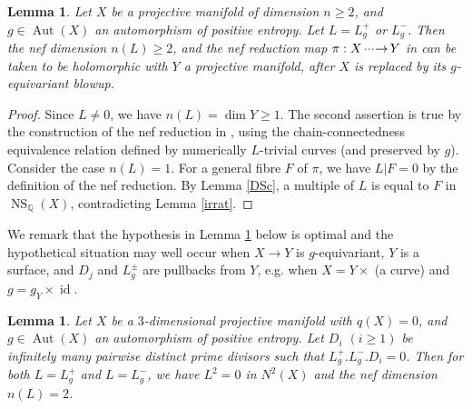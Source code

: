 \documentclass[11pt,a4paper,psamsfonts]{amsart}
\theoremstyle{plain}
\newtheorem{lemma}[thm]{Lemma}
\theoremstyle{definition}
\theoremstyle{remark}
\begin{document}
\begin{lemma}\label{nefR}
Let $X$ be a projective manifold of dimension $n \ge 2$, and $g \in {\operatorname{Aut}}(X)$
an automorphism of positive entropy. Let $L = L_g^+$ or $L_g^-$.
Then the nef dimension $n(L) \ge 2$, and
the nef reduction map $\pi : X {{\,\cdot\negmedspace\cdot\negmedspace\cdot\negmedspace\to\,}} Y$ in \cite{8aut} can be taken to be
holomorphic with $Y$ a projective manifold, after $X$ is replaced by its
$g$-equivariant blowup.
\end{lemma}

\begin{proof}
Since $L \ne 0$, we have $n(L) = \dim Y \ge 1$.
The second assertion is true by the construction of the nef reduction in \cite[Theorem 2.6]{8aut},
using the chain-connectedness equivalence relation
defined by numerically $L$-trivial curves (and preserved by $g$).
Consider the case $n(L) = 1$. For a general fibre $F$ of $\pi$,
we have $L|F = 0$ by the definition of the nef reduction. By Lemma \ref{DSc},
a multiple of $L$ is equal to $F$ in ${\operatorname{NS}}_{\mathbb{Q}}(X)$, contradicting Lemma \ref{irrat}.
\end{proof}

We remark that the hypothesis in Lemma \ref{LggNull} below is optimal and
the hypothetical situation may well occur when $X \to Y$ is $g$-equivariant,
$Y$ is a surface, and $D_j$ and $L_g^{\pm}$ are
pullbacks from $Y$, e.g. when $X = Y \times$ (a curve) and $g = g_Y \times {\operatorname{id}}$.

\begin{lemma}\label{LggNull}
Let $X$ be a $3$-dimensional projective manifold with $q(X) = 0$, and $g \in {\operatorname{Aut}}(X)$
an automorphism of positive entropy. Let $D_i$ $(i \ge 1)$ be infinitely many
pairwise distinct prime divisors such that
$L_g^+ . L_g^- . D_i = 0$. Then for both $L = L_g^+$ and $L = L_g^-$, we have
$L^2 = 0$ in $N^2(X)$ and the nef dimension
$n(L) = 2$.
\end{lemma}
\end{document}
